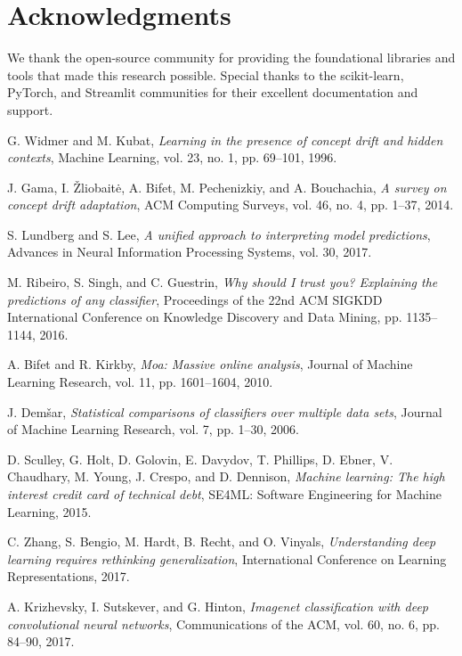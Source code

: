 \documentclass{article}
\begin{document}
\section*{Acknowledgments}

We thank the open-source community for providing the foundational libraries and tools that made this research possible. Special thanks to the scikit-learn, PyTorch, and Streamlit communities for their excellent documentation and support.


\begin{thebibliography}{9}

G. Widmer and M. Kubat,
\textit{Learning in the presence of concept drift and hidden contexts},
Machine Learning, vol. 23, no. 1, pp. 69--101, 1996.

J. Gama, I. Žliobaitė, A. Bifet, M. Pechenizkiy, and A. Bouchachia,
\textit{A survey on concept drift adaptation},
ACM Computing Surveys, vol. 46, no. 4, pp. 1--37, 2014.

S. Lundberg and S. Lee,
\textit{A unified approach to interpreting model predictions},
Advances in Neural Information Processing Systems, vol. 30, 2017.

M. Ribeiro, S. Singh, and C. Guestrin,
\textit{Why should I trust you? Explaining the predictions of any classifier},
Proceedings of the 22nd ACM SIGKDD International Conference on Knowledge Discovery and Data Mining, pp. 1135--1144, 2016.

A. Bifet and R. Kirkby,
\textit{Moa: Massive online analysis},
Journal of Machine Learning Research, vol. 11, pp. 1601--1604, 2010.

J. Demšar,
\textit{Statistical comparisons of classifiers over multiple data sets},
Journal of Machine Learning Research, vol. 7, pp. 1--30, 2006.

D. Sculley, G. Holt, D. Golovin, E. Davydov, T. Phillips, D. Ebner, V. Chaudhary, M. Young, J. Crespo, and D. Dennison,
\textit{Machine learning: The high interest credit card of technical debt},
SE4ML: Software Engineering for Machine Learning, 2015.

C. Zhang, S. Bengio, M. Hardt, B. Recht, and O. Vinyals,
\textit{Understanding deep learning requires rethinking generalization},
International Conference on Learning Representations, 2017.

A. Krizhevsky, I. Sutskever, and G. Hinton,
\textit{Imagenet classification with deep convolutional neural networks},
Communications of the ACM, vol. 60, no. 6, pp. 84--90, 2017.

\end{thebibliography}
\end{document}
